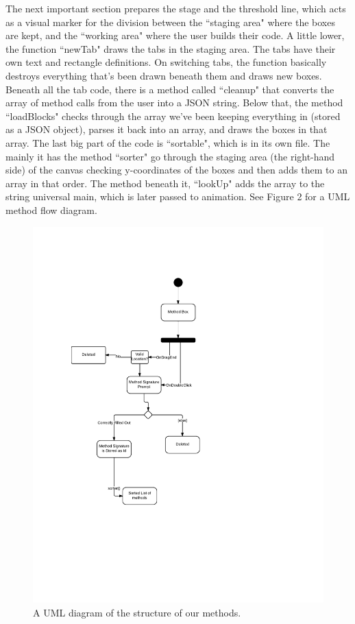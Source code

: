 \documentclass[a4paper]{article}
\begin{document}
The next important section prepares the stage and the threshold line, which acts as a visual marker for the division between the ``staging area" where the boxes are kept, and the ``working area" where the user builds their code. A little lower, the function ``newTab" draws the tabs in the staging area. The tabs have their own text and rectangle definitions. On switching tabs, the function basically destroys everything that's been drawn beneath them and draws new boxes. 
Beneath all the tab code, there is a method called ``cleanup" that converts the array of method calls from the user into a JSON string. Below that, the method ``loadBlocks" checks through the array we've been keeping everything in (stored as a JSON object), parses it back into an array, and draws the boxes in that array. The last big part of the code is ``sortable", which is in its own file. The mainly it has the method ``sorter" go through the staging area (the right-hand side) of the canvas checking y-coordinates of the boxes and then adds them to an array in that order. The method beneath it, ``lookUp" adds the array to the string universal main, which is later passed to animation.
See Figure 2 for a UML method flow diagram.

\begin{figure}[h!]
  \caption{A UML diagram of the structure of our methods.}
  \centering
	\includegraphics[]{methodBoxflow}
\end{figure}
\end{document}
